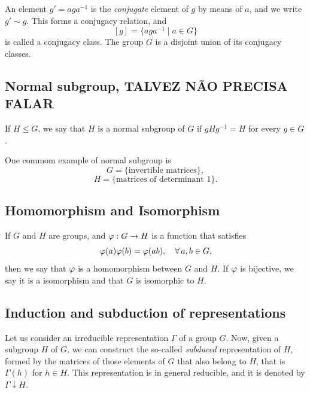 An element $g' = a g a^{-1}$ is the \textit{conjugate} element of $g$ by means of $a$, and we write $g' \sim g$. This forms a conjugacy relation, and
$$
[g] = \{a g a^{-1} \mid a \in G\}
$$
is called a conjugacy class. The group $G$ is a disjoint union of its conjugacy classes.

\subsection{Normal subgroup, TALVEZ NÃO PRECISA FALAR}

If $H \leq G$, we say that $H$ is a normal subgroup of $G$ if $g H g^{-1} = H$ for every $g \in G$.

One commom example of normal subgroup is
$$
G = \{ \text{invertible matrices} \},
$$
$$
H = \{ \text{matrices of determinant 1} \}.
$$

\subsection{Homomorphism and Isomorphism}

If $G$ and $H$ are groups, and $\varphi: G \to H$ is a function that satisfies
$$
\varphi(a)\varphi(b) = \varphi(ab), \quad \forall \, a,b \in G,
$$
then we say that $\varphi$ is a homomorphism between $G$ and $H$. If $\varphi$ is bijective, we say it is a isomorphism and that $G$ is isomorphic to $H$.

\subsection{Induction and subduction of representations}

Let us consider an irreducible representation $\Gamma$ of a group $G$. Now, given a subgroup $H$ of $G$, we can construct the so-called \textit{subduced} representation of $H$, formed by the matrices of those elements of $G$ that also belong to $H$, that is $\Gamma(h)$ for $h \in H$. This representation is in general reducible, and it is denoted by $\Gamma \downarrow H$.

